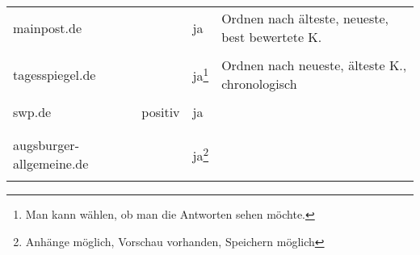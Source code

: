 \begin{landscape}
\begin{longtable}{l|p{40mm}p{40mm}p{80mm}}
  mainpost.de & & ja & Ordnen nach älteste, neueste, best bewertete K.\\
           & \multicolumn{3}{c}{}\\\hline

  tagesspiegel.de & & ja\footnote{Man kann wählen, ob man die Antworten sehen möchte.} &
    Ordnen nach neueste, älteste K., chronologisch\\
    & \multicolumn{3}{c}{}\\\hline

    swp.de & positiv & ja & \\
        & \multicolumn{3}{c}{}\\\hline \\

    augsburger-allgemeine.de &
      & ja\footnote{Anhänge möglich, Vorschau vorhanden, Speichern möglich} & \\
      & \multicolumn{3}{c}{}\\\hline

\end{longtable}
\end{landscape}



